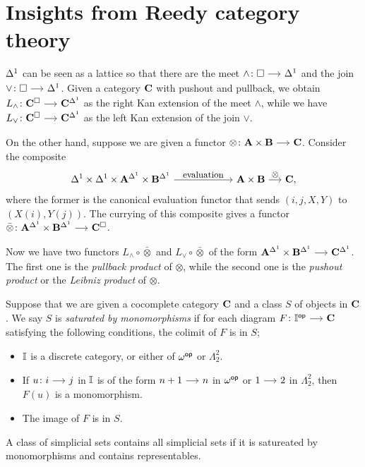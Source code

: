 \documentclass[a4paper,  dvipsnames, 11pt]{amsart}
\begin{document}
\section{Insights from Reedy category theory}
\begin{observation}
	\label{obs:Leibniz}
	${\Delta^1}$ can be seen as a lattice so that there are
	the meet $\land\colon\Box\arr\ra$ and the join $\lor\colon\Box\arr\ra$.
	Given a category $\mathbf{C}$ with pushout and pullback,
	we obtain $L_\land\colon\one{C}^\Box\arr\one{C}^\ra$ as the right Kan extension of the meet $\land$,
	while we have $L_\lor\colon\one{C}^\Box\arr\one{C}^\ra$ as the left Kan extension of the join $\lor$.

	On the other hand, suppose we are given a functor $\otimes\colon\one{A}\times\one{B}\arr\one{C}$.
	Consider the composite
	\[
		\ra\times\ra\times\one{A}^\ra\times\one{B}^\ra
		\arr"\text{evaluation}"[][6]
		\one{A}\times\one{B}
		\arr"\otimes"
		\one{C}\text{,}
	\]
	where the former is the canonical evaluation functor that sends $(i,j,X,Y)$ to $(X(i),Y(j))$.
	The currying of this composite gives a functor $\bar\otimes\colon\one{A}^\ra\times\one{B}^\ra\arr\one{C}^\Box$.

	Now we have two functors $L_\land\circ\bar\otimes$ and $L_\lor\circ\bar\otimes$ of the form $\one{A}^\ra\times\one{B}^\ra\arr\one{C}^\ra$.
	The first one is the \textit{pullback product} of $\otimes$, while the second one is the \textit{pushout product} or the \textit{Leibniz product} of $\otimes$.
\end{observation}
\begin{definition}
	\label{defn:SatMono}
	Suppose that we are given a cocomplete category $\mathbf{C}$ and a class $S$ of objects in $\mathbf{C}$.
	We say $S$ is \emph{saturated by monomorphisms}
	if for each diagram $F\colon\dI^\op\arr\one{C}$ satisfying the following conditions,
	the colimit of $F$ is in $S$;
	\begin{itemize}
		\item %
			$\mathbb{I}$ is a discrete category, or either of
			$\omega^{\mathsf{op}}$ or $\Lambda^2_2$.
		\item %
			If $u\colon i\arr j$ in $\mathbb{I}$ is of the form $n+1\arr n$ in $\omega^{\mathsf{op}}$ or $1\arr 2$ in $\Lambda^2_2$,
			then $F(u)$ is a monomorphism.
		\item %
			The image of $F$ is in $S$.
		\qedhere %
	\end{itemize}
\end{definition}
\begin{fact}
	\label{fact:SatMono}
	A class of simplicial sets contains all simplicial sets
	if it is satureated by monomorphisms and contains representables.
\end{fact}
\end{document}
